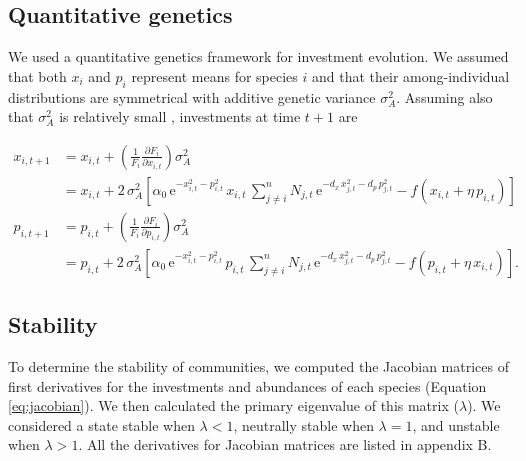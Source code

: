 \subsection*{Quantitative genetics}

We used a quantitative genetics framework for investment evolution.
We assumed that both $x_i$ and $p_i$ represent means for species $i$
and that their among-individual distributions are symmetrical with additive
genetic variance $\sigma^2_A$.
Assuming also that $\sigma^2_A$ is relatively small
\citep{Iwasa1991a,Abrams2001a,Abrams1993b}, 
investments at time $t+1$ are

\begin{equation} \label{eq:invest-change}
\begin{split}
    x_{i,t+1} &= x_{i,t} + \left( \frac{1}{F_i}
        \frac{\partial F_i}{\partial x_{i,t}} \right) \sigma^2_A \\
         &= x_{i,t} + 2 \, \sigma_A^2 \left[
            \alpha_0 \, \text{e}^{-x_{i,t}^2 - p_{i,t}^2} \, x_{i,t} \,
            \sum_{j \ne i}^{n}{ N_{j,t} \, \text{e}^{ 
                -d_x \, x_{j,t}^2 - d_p \, p_{j,t}^2 } }
            - f \left( x_{i,t} + \eta \, p_{i,t} \right) 
        \right]\\[1ex]
    p_{i,t+1} &= p_{i,t} + \left( \frac{1}{F_i}
        \frac{\partial F_i}{\partial p_{i,t}} \right) \sigma^2_A \\
        &= p_{i,t} + 2 \, \sigma_A^2 \left[
            \alpha_0 \, \text{e}^{-x_{i,t}^2 - p_{i,t}^2} \, p_{i,t} \,
            \sum_{j \ne i}^{n}{ N_{j,t} \, \text{e}^{ 
                -d_x \, x_{j,t}^2 - d_p \, p_{j,t}^2 } }
            - f \left( p_{i,t} + \eta \, x_{i,t} \right) 
        \right]
    \textrm{.}
\end{split}
\end{equation}


\subsection*{Stability}

To determine the stability of communities, we computed the Jacobian matrices
of first derivatives for the investments and abundances of each species
(Equation \ref{eq:jacobian}).
We then calculated the primary eigenvalue of this matrix ($\lambda$).
We considered a state stable when $\lambda < 1$,
neutrally stable when $\lambda = 1$,
and unstable when $\lambda > 1$.
All the derivatives for Jacobian matrices are listed in appendix B.




